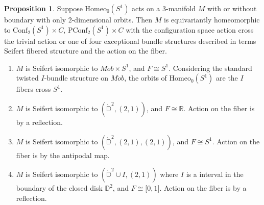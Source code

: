 \documentclass[10pt, oneside]{article}
\newcommand{\R}{\mathbb{R}}
\newcommand{\Z}{\mathbb{Z}}
\newcommand{\homeo}[1][S^1]{\text{Homeo}_0(#1)}
\newcommand{\conf}[2][S^1]{\text{Conf}_{#2}(#1)}
\newcommand{\pconf}[2][S^1]{\text{PConf}_{#2}(#1)}
\theoremstyle{definition}
\newtheorem{prop}{Proposition}[section]
\theoremstyle{definition}
\begin{document}
\begin{prop}\label{prop:orbit-bundle-computation}
    Suppose $\homeo$ acts on a 3-manifold $M$ with or without boundary with only 2-dimensional orbits. Then $M$ is equivariantly homeomorphic to $\conf{2}\times C$, $\pconf{2}\times C$ with the configuration space action cross the trivial action or one of four exceptional bundle structures described in terms Seifert fibered structure and the action on the fiber.
    \begin{enumerate}
        \item $M$ is Seifert isomorphic to $M\ddot{o}b\times S^1$, and $F\cong S^1$. Considering the standard twisted $I$-bundle structure on $M\ddot{o}b$, the orbits of $\homeo$ are the $I$ fibers cross $S^1$.
        \item $M$ is Seifert isomorphic to $(\mathring{\mathbb{D}}^2, (2, 1))$, and $F\cong \R$. Action on the fiber is by a reflection.
        \item $M$ is Seifert isomorphic to $(\mathring{\mathbb{D}}^2, (2, 1), (2,1))$, and $F\cong S^1$. Action on the fiber is by the antipodal map.
        \item $M$ is Seifert isomorphic to $(\mathring{\mathbb{D}}^2\cup I, (2,1))$ where $I$ is a interval in the boundary of the closed disk $\mathbb{D}^2$, and $F \cong \lbrack 0,1\rbrack$. Action on the fiber is by a reflection.
    \end{enumerate}

\end{prop}
\end{document}
